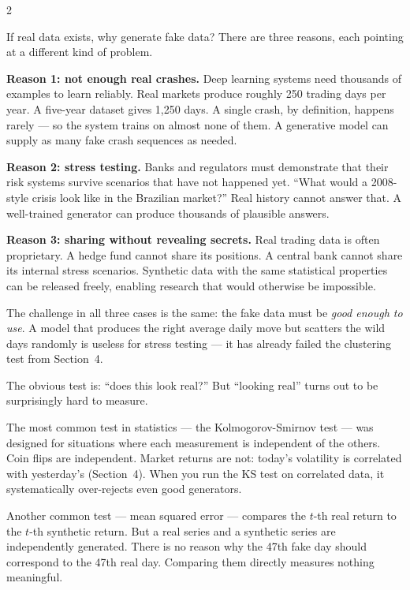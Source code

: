 \documentclass[10pt]{article}
\newcommand{\skybox}[2]{\begin{tcolorbox}[mybox={Sky}{BBg},title={#1}]#2\end{tcolorbox}}
\begin{document}
\begin{multicols}{2}

\skybox{5\quad Why Anyone Wants Synthetic Markets}{%
If real data exists, why generate fake data? There are three reasons, each pointing at a different kind of problem.

\medskip
\textbf{Reason 1: not enough real crashes.} Deep learning systems need thousands of examples to learn reliably. Real markets produce roughly 250 trading days per year. A five-year dataset gives 1{,}250 days. A single crash, by definition, happens rarely --- so the system trains on almost none of them. A generative model can supply as many fake crash sequences as needed.

\medskip
\textbf{Reason 2: stress testing.} Banks and regulators must demonstrate that their risk systems survive scenarios that have not happened yet. ``What would a 2008-style crisis look like in the Brazilian market?'' Real history cannot answer that. A well-trained generator can produce thousands of plausible answers.

\medskip
\textbf{Reason 3: sharing without revealing secrets.} Real trading data is often proprietary. A hedge fund cannot share its positions. A central bank cannot share its internal stress scenarios. Synthetic data with the same statistical properties can be released freely, enabling research that would otherwise be impossible.

\smallskip
The challenge in all three cases is the same: the fake data must be \emph{good enough to use}. A model that produces the right average daily move but scatters the wild days randomly is useless for stress testing --- it has already failed the clustering test from Section~4.}

\skybox{6\quad Why Judging It Is Hard}{%
The obvious test is: ``does this look real?'' But ``looking real'' turns out to be surprisingly hard to measure.

The most common test in statistics --- the Kolmogorov-Smirnov test --- was designed for situations where each measurement is independent of the others. Coin flips are independent. Market returns are not: today's volatility is correlated with yesterday's (Section~4). When you run the KS test on correlated data, it systematically over-rejects even good generators.

Another common test --- mean squared error --- compares the $t$-th real return to the $t$-th synthetic return. But a real series and a synthetic series are independently generated. There is no reason why the 47th fake day should correspond to the 47th real day. Comparing them directly measures nothing meaningful.

}
\end{multicols}
\end{document}
